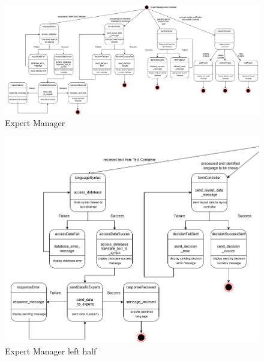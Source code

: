 \begin{figure}[H]
	\centering
	\includegraphics[width=\textwidth, height=\textheight, keepaspectratio]{Section2/images/Expert_Manager_state_diagram.png}
	\caption{Expert Manager}
	\label{ExpertManager}
\end{figure}

\begin{figure}[H]
	\centering
	\includegraphics[width=\textwidth, height=\textheight, keepaspectratio]{Section2/images/Expert_Manager_state_diagram_left_half.png}
	\caption{Expert Manager left half}
	\label{ExpertManagerp1}
\end{figure}


